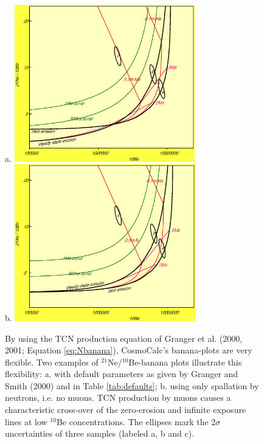 \documentclass{article}
\begin{document}
\begin{figure}[htbp]
  \centering
a.  \includegraphics[width=0.7\textwidth]{2006GC001530-f02a_orig.eps}\\
b.  \includegraphics[width=0.7\textwidth]{2006GC001530-f02b_orig.eps}\\
  \caption{
    By using  the TCN  production equation of  Granger et  al.  (2000,
    2001;  Equation  \ref{eq:Nbanana}),  CosmoCalc's banana-plots  are
    very flexible.   Two examples of  $^{21}$Ne/$^{10}$Be-banana plots
    illustrate this  flexibility: a. with default  parameters as given
    by Granger  and Smith (2000)  and in Table \ref{tab:defaults};  b. 
    using only spallation by neutrons, i.e.  no muons.  TCN production
    by muons  causes a  characteristic cross-over of  the zero-erosion
    and infinite exposure lines  at low $^{10}$Be concentrations.  The
    ellipses  mark  the   2$\sigma$  uncertainties  of  three  samples
    (labeled a, b and c).}
  \label{fig:compareBananas}
\end{figure}
\end{document}
